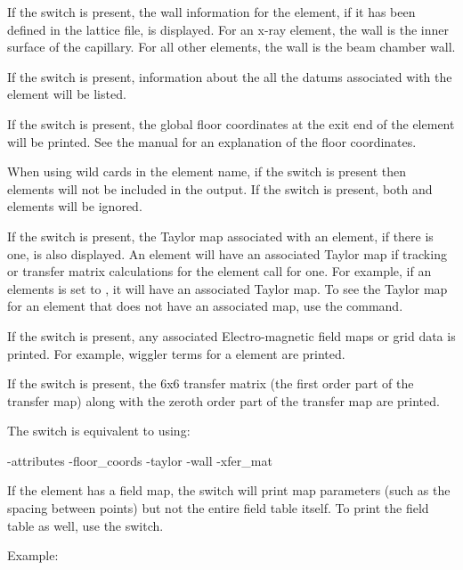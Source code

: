 {{{{{{{{{If the  switch is present, the wall information for the element, if it has been defined in
the lattice file, is displayed. For an x-ray  element, the wall is the inner surface
of the capillary. For all other elements, the wall is the beam chamber wall.

If the  switch is present, information about the all the datums associated with the
element will be listed.

If the  switch is present, the global floor coordinates at the exit end of the
element will be printed. See the \bmad manual for an explanation of the floor coordinates.

When using wild cards in the element name, if the  switch is present then
 elements will not be included in the output. If the  switch is
present, both  and  elements will be ignored.

If the  switch is present, the Taylor map associated with an element, if there is one,
is also displayed. An element will have an associated Taylor map if tracking or transfer matrix
calculations for the element call for one. For example, if an elements  is set
to , it will have an associated Taylor map. To see the Taylor map for an element that
does not have an associated map, use the  command.

If the  switch is present, any associated Electro-magnetic field maps or grid data is
printed. For example, wiggler terms for a   element are printed.

If the  switch is present, the 6x6 transfer matrix (the first order part of the
transfer map) along with the zeroth order part of the transfer map are printed.

The  switch is equivalent to using:
\begin{example}
  -attributes
  -floor_coords
  -taylor
  -wall
  -xfer_mat
\end{example}
If the element has a field map, the  switch will print map parameters (such as the spacing between points) but
not the entire field table itself. To print the field table as well, use the  switch.

Example:

}}}}}}}}}
